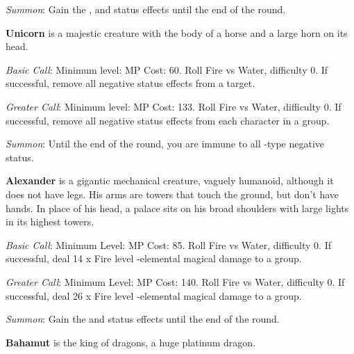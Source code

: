 \begin{multicols}{2}
    \textit{Summon}: Gain the  ,   and   status effects until the end of the round.

    \ffcrystal[type=level,height=8pt]
    
    \textbf{Unicorn} is a majestic creature with the body of a horse and a large horn on its head.
    
    \textit{Basic Call}: Minimum level:  MP Cost: 60. Roll Fire vs Water, difficulty 0. If successful, remove all negative status effects from a target.
    
    \textit{Greater Call}: Minimum level:  MP Cost: 133. Roll Fire vs Water, difficulty 0. If successful, remove all negative status effects from each character in a group.
    
    \textit{Summon}: Until the end of the round, you are immune to all -type  negative status.

    \ffcrystal[type=level,height=8pt]
    
    \textbf{Alexander} is a gigantic mechanical creature, vaguely humanoid, although it does not have legs. His arms are towers that touch the ground, but don’t have hands. In place of his head, a palace sits on his broad shoulders with large lights in its highest towers.
    
    \textit{Basic Call}: Minimum Level:  MP Cost: 85. Roll Fire vs Water, difficulty 0. If successful, deal 14 x Fire level -elemental magical damage to a group.
    
    \textit{Greater Call}: Minimum Level:  MP Cost: 140. Roll Fire vs Water, difficulty 0. If successful, deal 26 x Fire level -elemental magical damage to a group.
    
    \textit{Summon}: Gain the   and   status effects until the end of the round.

    \ffcrystal[type=level,height=8pt]
    
    \textbf{Bahamut} is the king of dragons, a huge platinum dragon.
    

\end{multicols}
